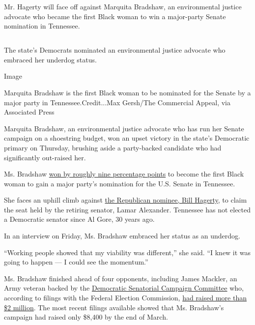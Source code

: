 Mr. Hagerty will face off against Marquita Bradshaw, an environmental
justice advocate who became the first Black woman to win a major-party
Senate nomination in Tennessee.

\hypertarget{-8}{%
\subsection{}\label{-8}}

The state's Democrats nominated an environmental justice advocate who
embraced her underdog status.

Image

Marquita Bradshaw is the first Black woman to be nominated for the
Senate by a major party in Tennessee.Credit...Max Gersh/The Commercial
Appeal, via Associated Press

Marquita Bradshaw, an environmental justice advocate who has run her
Senate campaign on a shoestring budget, won an upset victory in the
state's Democratic primary on Thursday, brushing aside a party-backed
candidate who had significantly out-raised her.

Ms. Bradshaw
\href{https://www.nytimes3xbfgragh.onion/interactive/2020/08/06/us/elections/results-tennessee-senate-primary-election.html}{won
by roughly nine percentage points} to become the first Black woman to
gain a major party's nomination for the U.S. Senate in Tennessee.

She faces an uphill climb against
\href{https://www.nytimes3xbfgragh.onion/2020/08/06/us/politics/tennessee-senate-primary-hagerty.html}{the
Republican nominee, Bill Hagerty}, to claim the seat held by the
retiring senator, Lamar Alexander. Tennessee has not elected a
Democratic senator since Al Gore, 30 years ago.

In an interview on Friday, Ms. Bradshaw embraced her status as an
underdog.

``Working people showed that my viability was different,'' she said. ``I
knew it was going to happen --- I could see the momentum.''

Ms. Bradshaw finished ahead of four opponents, including James Mackler,
an Army veteran backed by the
\href{https://www.dscc.org/news/dscc-endorses-james-mackler-in-tennessee-senate-race/}{Democratic
Senatorial Campaign Committee} who, according to filings with the
Federal Election Commission,
\href{https://www.fec.gov/data/committee/C00637850/}{had raised more
than \$2 million}. The most recent filings available showed that Ms.
Bradshaw's campaign had raised only \$8,400 by the end of March.

